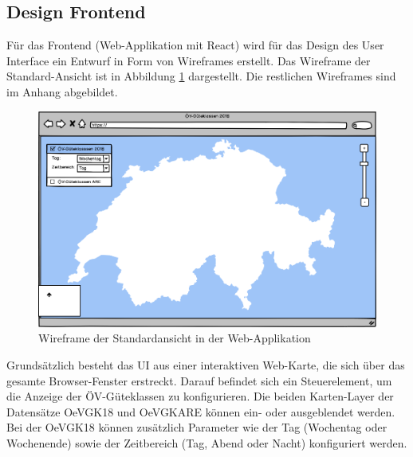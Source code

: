 \subsection{Design Frontend}
\label{analyse:Design Frontend}

Für das Frontend (Web-Applikation mit React) wird für das Design des User Interface ein Entwurf in Form von Wireframes erstellt.
Das Wireframe der Standard-Ansicht ist in Abbildung \ref{fig:wireframe_main} dargestellt.
Die restlichen Wireframes sind im Anhang  abgebildet.

\begin{figure}[ht]
    \centering
    \includegraphics[width=1\linewidth]{projectdoc/img/wireframes/standardansicht.png}
    \caption[Wireframe der Standardansicht in der Web-Applikation]{Wireframe der Standardansicht in der Web-Applikation}
    \label{fig:wireframe_main}
\end{figure}

Grundsätzlich besteht das UI aus einer interaktiven Web-Karte, die sich über das gesamte Browser-Fenster erstreckt.
Darauf befindet sich ein Steuerelement, um die Anzeige der \gls{ÖV-Güteklassen} zu konfigurieren.
Die beiden Karten-Layer der Datensätze \gls{OeVGK18} und \gls{OeVGKARE} können ein- oder ausgeblendet werden.
Bei der \gls{OeVGK18} können zusätzlich Parameter wie der Tag (Wochentag oder Wochenende) sowie der Zeitbereich (Tag, Abend oder Nacht) konfiguriert werden.
